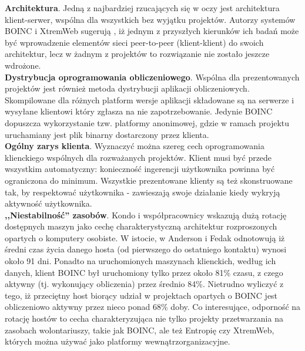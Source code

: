 \documentclass[12pt,a4paper,twoside]{article}
\begin{document}
\noindent \textbf{Architektura}. Jedną z najbardziej rzucających się w oczy jest architektura klient-serwer, wspólna dla wszystkich bez wyjątku projektów. Autorzy systemów BOINC i XtremWeb sugerują \cite{boinc,xtremweb}, iż jednym z przyszłych kierunków ich badań może być wprowadzenie elementów sieci peer-to-peer (klient-klient) do swoich architektur, lecz w żadnym z projektów to rozwiązanie nie zostało jeszcze wdrożone. \\
\textbf{Dystrybucja oprogramowania obliczeniowego}. Wspólna dla prezentowanych projektów jest również metoda dystrybucji aplikacji obliczeniowych. Skompilowane dla różnych platform wersje aplikacji składowane są na serwerze i wysyłane klientowi który zgłasza na nie zapotrzebowanie. Jedynie BOINC dopuszcza wykorzystanie tzw. platformy anonimowej, gdzie w ramach projektu uruchamiany jest plik binarny dostarczony przez klienta.\\
\textbf{Ogólny zarys klienta}. Wyznaczyć można szereg cech oprogramowania klienckiego wspólnych dla rozważanych projektów. Klient musi być przede wszystkim automatyczny: konieczność ingerencji użytkownika powinna być ograniczona do minimum. Wszystkie prezentowane klienty są też skonstruowane tak, by respektować użytkownika - zawieszają swoje działanie kiedy wykryją aktywność użytkownika.\\
\textbf{,,Niestabilność'' zasobów}. Kondo i współpracownicy wskazują \cite{evaluating} dużą rotację dostępnych maszyn jako cechę charakterystyczną architektur rozproszonych opartych o komputery osobiste. W istocie, w \cite{computational} Anderson i Fedak odnotowują iż średni czas życia danego hosta (od pierwszego do ostatniego kontaktu) wynosi około 91 dni. Ponadto na uruchomionych maszynach klienckich, według ich danych, klient BOINC był uruchomiony tylko przez około 81\% czasu, z czego aktywny (tj. wykonujący obliczenia) przez średnio 84\%. Nietrudno wyliczyć z tego, iż przeciętny host biorący udział w projektach opartych o BOINC jest obliczeniowo aktywny przez nieco ponad 68\% doby. Co interesujące, odporność na rotację hostów to cecha charakteryzująca nie tylko projekty przetwarzania na zasobach wolontariuszy, takie jak BOINC, ale też Entropię czy XtremWeb, których można używać jako platformy wewnątrzorganizacyjne.
\end{document}
